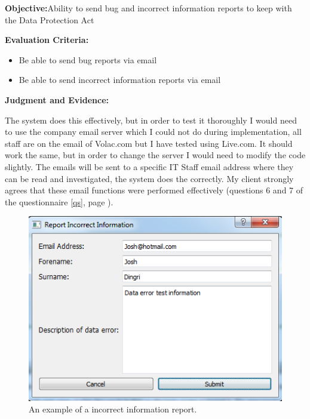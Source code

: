 \textbf{Objective:}Ability to send bug and incorrect information reports to keep with the Data Protection Act

\textbf{Evaluation Criteria:}
\begin{itemize}
\item{Be able to send bug reports via email}
\item{Be able to send incorrect information reports via email}
\end{itemize}

\textbf{Judgment and Evidence:}

The system does this effectively, but in order to test it thoroughly I would need to use the company email server which I could not do during implementation, all staff are on the email of Volac.com but I have tested using Live.com. It should work the same, but in order to change the server I would need to modify the code slightly. The emails will be sent to a specific IT Staff email address where they can be read and investigated, the system does the correctly. My client strongly agrees that these email functions were performed effectively (questions 6 and 7 of the questionnaire \ref{qs}, page \pageref{qs}).


\begin{figure}[H]
    \includegraphics[width=\textwidth]{./Testing/Images/SubmitErrorReport.png}
    \caption{An example of a incorrect information report.} 
\end{figure}

